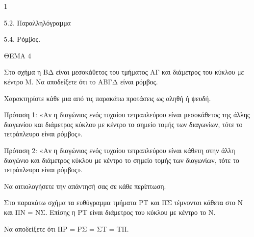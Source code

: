 \begin{ylh}{1}
    \item 5.2. Παραλληλόγραμμα
    \item 5.4. Ρόμβος.
\end{ylh}

ΘΕΜΑ 4

\begin{alist}
\item Στο σχήμα η ΒΔ είναι μεσοκάθετος του τμήματος ΑΓ και διάμετρος του κύκλου με κέντρο Μ. Να αποδείξετε ότι το ΑΒΓΔ είναι ρόμβος. 



\item Χαρακτηρίστε κάθε μια από τις παρακάτω προτάσεις ως αληθή ή ψευδή.

Πρόταση 1: «Αν η διαγώνιος ενός τυχαίου τετραπλεύρου είναι μεσοκάθετος της άλλης διαγωνίου και διάμετρος κύκλου με κέντρο το σημείο τομής των διαγωνίων, τότε το τετράπλευρο είναι ρόμβος».

Πρόταση 2: «Αν η διαγώνιος ενός τυχαίου τετραπλεύρου είναι κάθετη στην άλλη διαγώνιο και διάμετρος κύκλου με κέντρο το σημείο τομής των διαγωνίων, τότε το τετράπλευρο είναι ρόμβος».

Να αιτιολογήσετε την απάντησή σας σε κάθε περίπτωση.


\item Στο παρακάτω σχήμα τα ευθύγραμμα τμήματα ΡΤ και ΠΣ τέμνονται κάθετα στο Ν και ΠΝ = ΝΣ. Επίσης η ΡΤ είναι διάμετρος του κύκλου με κέντρο το Ν.

Να αποδείξετε ότι ΠΡ = ΡΣ = ΣΤ = ΤΠ. 


\end{alist}
